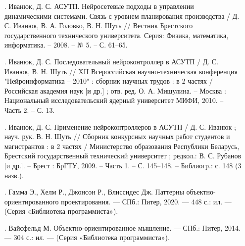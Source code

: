 {\begin{itemize}[leftmargin=2.15cm, labelwidth=0.65cm, labelsep=0.0cm]
    \item[\theimagecntr.] Иванюк, Д. С. АСУТП. Нейросетевые подходы в управлении динамическими системами. Связь с уровнем планирования производства / Д. С. Иванюк, В. А. Головко, В. Н. Шуть // Вестник Брестского государственного технического университета. Серия: Физика, математика, информатика. {--} 2008. {--} № 5. {--} С. 61–65.
    \addtocounter{imagecntr}{1}
    
    
    \item[\theimagecntr.] Иванюк, Д. С. Последовательный нейроконтроллер в АСУТП / Д. С. Иванюк, В. Н. Шуть // XII Всероссийская научно-техническая конференция "Нейроинформатика {--} 2010" : сборник научных трудов : в 2 частях / Российская академия наук [и др.] ; отв. ред. О. А. Мишулина. {--} Москва : Национальный исследовательский ядерный университет МИФИ, 2010. {--} Часть 2. {--} С. 13.
    \addtocounter{imagecntr}{1}
    
    \item[\theimagecntr.] Иванюк, Д. С. Применение нейроконтроллеров в АСУТП / Д. С. Иванюк ; науч. рук. В. Н. Шуть // Сборник конкурсных научных работ студентов и магистрантов : в 2 частях / Министерство образования Республики Беларусь, Брестский государственный технический университет ; редкол.: В. С. Рубанов [и др.]. {--} Брест : БрГТУ, 2009. {--} Часть 1. {--} С. 145–148. {--} Библиогр.: с. 148 (3 назв.).
    \addtocounter{imagecntr}{1}
    
    
    \item[\theimagecntr.] Гамма Э., Хелм Р., Джонсон Р., Влиссидес Дж. Паттерны объектно- ориентированного проектирования. — СПб.: Питер, 2020. — 448 с.: ил. — (Серия «Библиотека программиста»).
    \addtocounter{imagecntr}{1}
   
    
    \item[\theimagecntr.] Вайсфельд М. Объектно-ориентированное мышление. — СПб.: Питер, 2014. — 304 с.: ил. —
    (Серия «Библиотека программиста»).
    \addtocounter{imagecntr}{1}
    

\end{itemize}}
